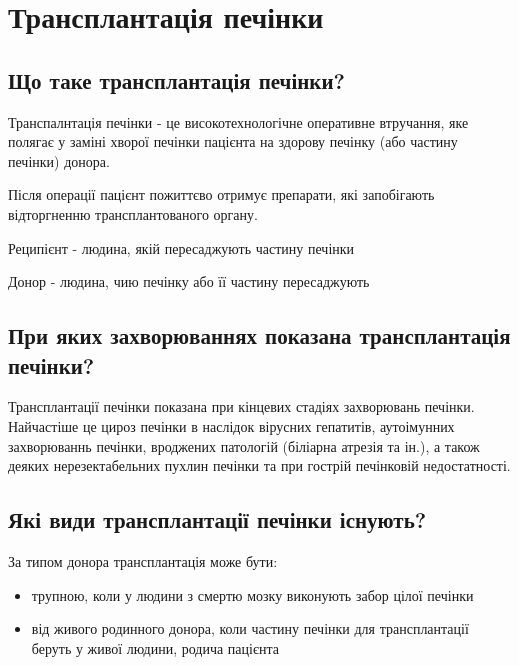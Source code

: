 \chapter{Трансплантація печінки}

\section{Що таке трансплантація печінки?}

Транспалнтація печінки - це високотехнологічне оперативне втручання, яке полягає у заміні хворої печінки пацієнта на здорову печінку (або частину печінки) донора. 

Після операції пацієнт пожиттєво отримує препарати, які запобігають відторгненню трансплантованого органу.

\begin{tcolorbox}[width=\textwidth,colback=yellow!5!white,colframe=yellow!75!black]    
Реципієнт - людина, якій пересаджують частину печінки
\end{tcolorbox}    

\begin{tcolorbox}[width=\textwidth,colback=yellow!5!white,colframe=yellow!75!black]    
Донор - людина, чию печінку або її частину пересаджують
\end{tcolorbox}    

\section{При яких захворюваннях показана трансплантація печінки?}

Трансплантації печінки показана при кінцевих стадіях захворювань печінки. Найчастіше це цироз печінки в наслідок вірусних гепатитів, аутоімунних захворюваннь печінки, вроджених патологій (біліарна атрезія та ін.), а також деяких нерезектабельних пухлин печінки та при гострій печінковій недостатності.


\section{Які види трансплантації печінки існують?}

За типом донора трансплантація може бути:
\begin{itemize}
    \item трупною, коли у людини з смертю мозку виконують забор цілої печінки
    \item від живого родинного донора, коли частину печінки для трансплантації беруть у живої людини, родича пацієнта 
\end{itemize}


